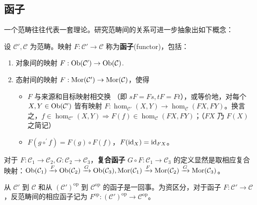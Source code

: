 \subsection{函子}\label{sec:functors}
一个范畴往往代表一套理论。研究范畴间的关系可进一步抽象出如下概念：
\begin{definition}
    设 $\mathcal{C}',\mathcal{C}$ 为范畴。映射 $F: \mathcal{C}' \to \mathcal{C}$ 称为\textbf{函子}(functor)，包括：
    \begin{enumerate}
        \item 对象间的映射 $F: \operatorname{Ob}(\mathcal C')\to\operatorname{Ob}(\mathcal C)$.
        \item 态射间的映射 $F: \operatorname{Mor}(\mathcal C')\to \operatorname{Mor}(\mathcal C)$，使得
            \begin{itemize}
                \item $F$ 与来源和目标映射相交换 （即 $sF=Fs,tF=Ft$），或等价地，对每个 $X, Y \in \operatorname{Ob}(\mathcal{C}')$ 皆有映射 $F: \hom_{\mathcal{C}'}(X, Y) \to \hom_{\mathcal{C}}(FX, FY)$。换言之，$f\in \hom_{\mathcal{C}'}(X, Y)\Rightarrow F(f)\in \hom_{\mathcal{C}}(FX, FY)$；（$FX$ 乃 $F(X)$ 之简记）
                \item $F(g\circ^{\prime} f) = F(g) \circ F(f)$，$F(\mathrm{id}_X) = \mathrm{id}_{FX}$。
            \end{itemize}
    \end{enumerate}
    对于 $F: \mathcal{C}_1 \to \mathcal{C}_2,G: \mathcal{C}_2 \to \mathcal{C}_3$，\textbf{复合函子} $G \circ F: \mathcal{C}_1 \to \mathcal{C}_3$ 的定义显然是取相应复合映射：$\operatorname{Ob}(\mathcal{C}_1) \xrightarrow{F} \operatorname{Ob}(\mathcal{C}_2) \xrightarrow{G} \operatorname{Ob}(\mathcal{C}_3), \operatorname{Mor}(\mathcal{C}_1) \xrightarrow{F} \operatorname{Mor}(\mathcal{C}_2) \xrightarrow{G} \operatorname{Mor}(\mathcal{C}_3)$。
\end{definition}

\begin{remark}
	从 $\mathcal{C}'$ 到 $\mathcal{C}$ 和从 $(\mathcal{C}')^\mathrm{op}$ 到 $\mathcal{C}^\mathrm{op}$ 的函子是一回事。为资区分，对于函子 $F: \mathcal{C}' \to \mathcal{C}$，反范畴间的相应函子记为 $F^\mathrm{op}: (\mathcal{C}')^\mathrm{op} \to \mathcal{C}^\mathrm{op}$。
\end{remark}

